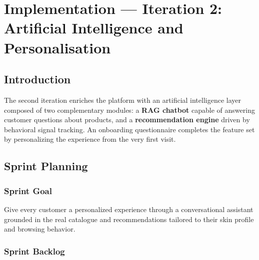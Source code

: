 \chapter{Implementation --- Iteration 2: Artificial Intelligence and Personalisation}

\section*{Introduction}
The second iteration enriches the platform with an artificial intelligence layer
composed of two complementary modules: a \textbf{RAG chatbot} capable of answering
customer questions about products, and a \textbf{recommendation engine} driven by
behavioral signal tracking.
An onboarding questionnaire completes the feature set by personalizing the
experience from the very first visit.

\section{Sprint Planning}

\subsection{Sprint Goal}

\begin{tcolorbox}[colback=blue!5, colframe=blue!40, title=Sprint Goal --- Iteration 2]
Give every customer a personalized experience through a conversational assistant
grounded in the real catalogue and recommendations tailored to their skin profile
and browsing behavior.
\end{tcolorbox}

\subsection{Sprint Backlog}

